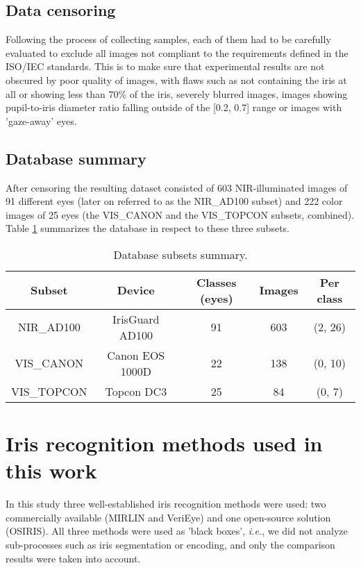 \documentclass[conference]{IEEEtran}
\begin{document}
\subsection{Data censoring}
Following the process of collecting samples, each of them had to be carefully evaluated to exclude all images not compliant to the requirements defined in the ISO/IEC standards. This is to make sure that experimental results are not obscured by poor quality of images, with flaws such as not containing the iris at all or showing less than 70\% of the iris, severely blurred images, images showing pupil-to-iris diameter ratio falling outside of the [0.2, 0.7] range or images with 'gaze-away' eyes.

\subsection{Database summary}
After censoring the resulting dataset consisted of 603 NIR-illuminated images of 91 different eyes (later on referred to as the NIR\_AD100 subset) and 222 color images of 25 eyes (the VIS\_CANON and the VIS\_TOPCON subsets, combined). Table \ref{database_summary} summarizes the database in respect to these three subsets. 

\begin{table}[!ht]
\renewcommand{\arraystretch}{1.1}

\caption{Database subsets summary.}
\label{database_summary}
\centering
\begin{tabular}{|c|c|c|c|c|}
\hline
\textbf{Subset} & \textbf{Device} & \textbf{Classes (eyes)} & \textbf{Images} & \textbf{Per class} \\
\hline
\hline
NIR\_AD100 & IrisGuard AD100 & 91 & 603 & (2, 26)\\
\hline
VIS\_CANON & Canon EOS 1000D & 22 & 138 & (0, 10)\\
\hline
VIS\_TOPCON & Topcon DC3 & 25 & 84 & (0, 7)\\
\hline
\end{tabular}
\end{table}

\section{Iris recognition methods used in this work}
\label{section:methods}

In this study three well-established iris recognition methods were used: two commercially available (MIRLIN and VeriEye) and one open-source solution (OSIRIS). All three methods were used as 'black boxes', \emph{i.e.}, we did not analyze sub-processes such as iris segmentation or encoding, and only the comparison results were taken into account. 
\end{document}
